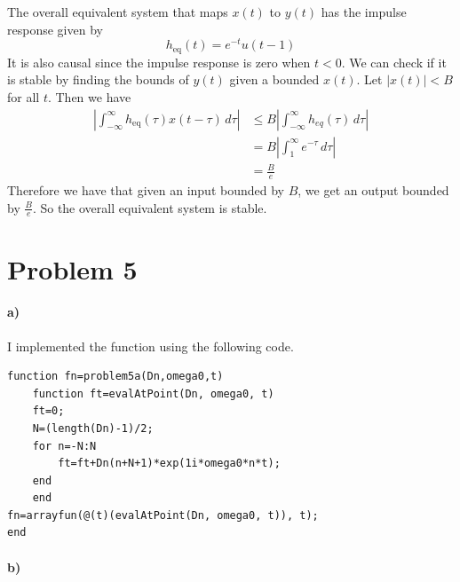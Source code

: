 \documentclass[12pt]{article}
\begin{document}
The overall equivalent system that maps \(x(t)\) to \(y(t)\) has the impulse response given by
\[h_\text{eq}(t)=e^{-t}u(t-1)\]
It is also causal since the impulse response is zero when \(t<0\).
We can check if it is stable by finding the bounds of \(y(t)\) given a bounded \(x(t)\). Let \(|x(t)|<B\) for all \(t\). Then we have
\begin{align*}
    \left|\int_{-\infty}^{\infty} h_\text{eq}(\tau)x(t-\tau)\, d\tau\right|&\leq B \left|\int_{-\infty}^{\infty} h_{eq}(\tau)\, d\tau\right|\\
    &=B\left|\int_1^\infty e^{-\tau}\, d\tau\right|\\
    &=\frac{B}{e}
\end{align*}
Therefore we have that given an input bounded by \(B\), we get an output bounded by \(\frac{B}{e}\). So the overall equivalent system is stable.

\section*{Problem 5}

\paragraph{a)}

I implemented the function using the following code.
\begin{verbatim}
function fn=problem5a(Dn,omega0,t)
    function ft=evalAtPoint(Dn, omega0, t)
    ft=0;
    N=(length(Dn)-1)/2;
    for n=-N:N
        ft=ft+Dn(n+N+1)*exp(1i*omega0*n*t);
    end
    end
fn=arrayfun(@(t)(evalAtPoint(Dn, omega0, t)), t);
end
\end{verbatim}

\paragraph{b)}
\end{document}
